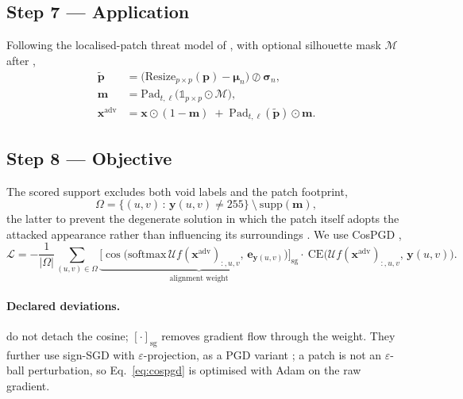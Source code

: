 \subsection{Step 7 — Application}

Following the localised-patch threat model of \citet{brown2017patch},
with optional silhouette mask $\mathcal{M}$ after \citet{tan2021lap},
\begin{align}
  \tilde{\mathbf{p}} &= \big(\mathrm{Resize}_{p\times p}(\mathbf{p})-\boldsymbol{\mu}_n\big)\oslash\boldsymbol{\sigma}_n, \\
  \mathbf{m} &= \mathrm{Pad}_{t,\ell}\big(\mathbb{1}_{p\times p}\odot\mathcal{M}\big), \\
  \mathbf{x}^{\mathrm{adv}} &= \mathbf{x}\odot(1-\mathbf{m})
  \;+\;\mathrm{Pad}_{t,\ell}(\tilde{\mathbf{p}})\odot\mathbf{m}.
  \label{eq:apply}
\end{align}

\subsection{Step 8 — Objective}

The scored support excludes both void labels and the patch footprint,
\begin{equation}
  \Omega=\{(u,v)\,:\,\mathbf{y}(u,v)\neq255\}\ \setminus\ \mathrm{supp}(\mathbf{m}),
\end{equation}
the latter to prevent the degenerate solution in which the patch itself
adopts the attacked appearance rather than influencing its surroundings
\citep{mirsky2023ipatch}. We use CosPGD \citep{agnihotri2024cospgd},
\begin{equation}
  \mathcal{L}=-\frac{1}{|\Omega|}\sum_{(u,v)\in\Omega}
  \underbrace{\Big[\cos\!\big(\mathrm{softmax}\,\mathcal{U}f(\mathbf{x}^{\mathrm{adv}})_{:,u,v},\,
  \mathbf{e}_{\mathbf{y}(u,v)}\big)\Big]_{\mathrm{sg}}}_{\text{alignment weight}}
  \cdot\ \mathrm{CE}\big(\mathcal{U}f(\mathbf{x}^{\mathrm{adv}})_{:,u,v},\,\mathbf{y}(u,v)\big).
  \label{eq:cospgd}
\end{equation}

\paragraph{Declared deviations.} \citet{agnihotri2024cospgd} do not
detach the cosine; $[\cdot]_{\mathrm{sg}}$ removes gradient flow through
the weight. They further use sign-SGD with $\varepsilon$-projection, as
a PGD variant \citep{madry2018pgd}; a patch is not an
$\varepsilon$-ball perturbation, so Eq.~\eqref{eq:cospgd} is optimised
with Adam \citep{kingma2015adam} on the raw gradient.

